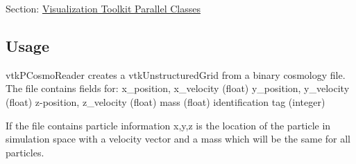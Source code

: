 Section\-: \hyperlink{sec_vtkparallel}{Visualization Toolkit Parallel Classes} \hypertarget{vtkwidgets_vtkxyplotwidget_Usage}{}\subsection{Usage}\label{vtkwidgets_vtkxyplotwidget_Usage}
vtk\-P\-Cosmo\-Reader creates a vtk\-Unstructured\-Grid from a binary cosmology file. The file contains fields for\-: x\-\_\-position, x\-\_\-velocity (float) y\-\_\-position, y\-\_\-velocity (float) z-\/position, z\-\_\-velocity (float) mass (float) identification tag (integer)

If the file contains particle information x,y,z is the location of the particle in simulation space with a velocity vector and a mass which will be the same for all particles.

